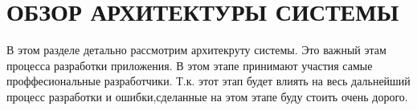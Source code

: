 \section{ОБЗОР АРХИТЕКТУРЫ СИСТЕМЫ}

В этом разделе детально рассмотрим архитекруту системы.
Это важный этам процесса разработки приложения. В этом этапе принимают участия самые проффесиональные разработчики. Т.к. этот этап будет влиять на весь дальнейший процесс разработки и ошибки,сделанные на этом этапе буду стоить очень дорого.



